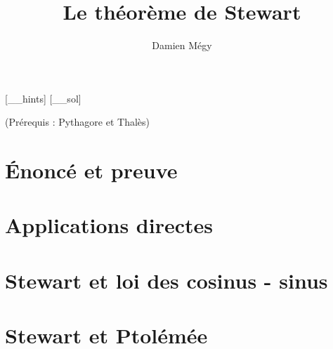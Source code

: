 




[_\jobname_hints]
[_\jobname_sol]


\title{Le théorème de Stewart}
\author{Damien Mégy}
\maketitle

\avertissement 


\tableofcontents

(Prérequis : Pythagore et Thalès)

\section{Énoncé et preuve}

\section{Applications directes}

\section{Stewart et  loi des cosinus -  sinus}

\section{Stewart et  Ptolémée}



\indications
\correction



